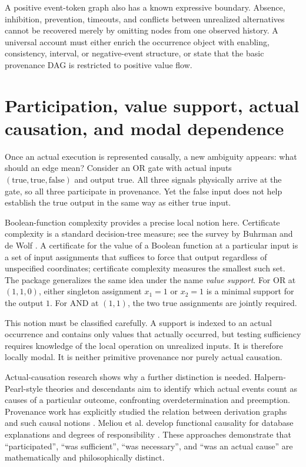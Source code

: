 \documentclass[11pt,a4paper]{article}
\begin{document}
A positive event-token graph also has a known expressive boundary. Absence, inhibition, prevention, timeouts, and conflicts between unrealized alternatives cannot be recovered merely by omitting nodes from one observed history. A universal account must either enrich the occurrence object with enabling, consistency, interval, or negative-event structure, or state that the basic provenance DAG is restricted to positive value flow.

\section{Participation, value support, actual causation, and modal dependence}

Once an actual execution is represented causally, a new ambiguity appears: what should an edge mean? Consider an OR gate with actual inputs $(\mathrm{true},\mathrm{true},\mathrm{false})$ and output $\mathrm{true}$. All three signals physically arrive at the gate, so all three participate in provenance. Yet the false input does not help establish the true output in the same way as either true input.

Boolean-function complexity provides a precise local notion here. Certificate complexity is a standard decision-tree measure; see the survey by Buhrman and de Wolf \cite{BuhrmanDeWolf2002}. A certificate for the value of a Boolean function at a particular input is a set of input assignments that suffices to force that output regardless of unspecified coordinates; certificate complexity measures the smallest such set. The package generalizes the same idea under the name \emph{value support}. For OR at $(1,1,0)$, either singleton assignment $x_1=1$ or $x_2=1$ is a minimal support for the output $1$. For AND at $(1,1)$, the two true assignments are jointly required.

This notion must be classified carefully. A support is indexed to an actual occurrence and contains only values that actually occurred, but testing sufficiency requires knowledge of the local operation on unrealized inputs. It is therefore locally modal. It is neither primitive provenance nor purely actual causation.

Actual-causation research shows why a further distinction is needed. Halpern-Pearl-style theories and descendants aim to identify which actual events count as causes of a particular outcome, confronting overdetermination and preemption. Provenance work has explicitly studied the relation between derivation graphs and such causal notions \cite{Cheney2010}. Meliou et al. develop functional causality for database explanations and degrees of responsibility \cite{Meliou2010}. These approaches demonstrate that ``participated'', ``was sufficient'', ``was necessary'', and ``was an actual cause'' are mathematically and philosophically distinct.
\end{document}

